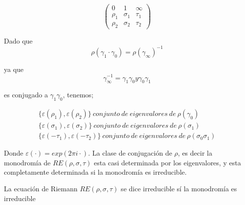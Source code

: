 \[ \left( \begin{array}{ccc}
0 & 1 & \infty \\
\rho_{1} & \sigma_{1} & \tau_{1} \\
\rho_{2} &\sigma_{2} & \tau_{2}  \end{array} \right)\]


Dado que 
\begin{equation}
\rho (\gamma_{1} \cdot \gamma_{0}) = \rho(\gamma_{\infty})^{-1}
\end{equation}

 ya que 
 \begin{equation}
 \gamma_{\infty}^{-1}=\gamma_{1} \gamma_{0}  y \gamma_{0}\gamma_{1}        
 \end{equation}
 
 
 es conjugado a $\gamma_{1} \gamma_{0}$, tenemos;

\begin{eqnarray} %
 \label{eqnarray:ecuacion1} \lbrace \varepsilon (\rho_{1}), \varepsilon (\rho_{2}) \rbrace \ conjunto \ de \ eigenvalores \ de \ \rho (\gamma_{0}) \\
 \lbrace \varepsilon (\sigma_{1}), \varepsilon (\sigma_{2}) \rbrace \  conjunto \ de \ eigenvalores \ de \ \rho (\sigma_{1}) \\
\lbrace \varepsilon(-\tau_{1}), \varepsilon (-\tau_{2}) \rbrace \  conjunto \ de \ eigenvalores \ de \ \rho (\sigma_{0} \sigma_{1})
\end{eqnarray}

Donde $\varepsilon (\cdot) = exp(2 \pi i \cdot)$. La clase de conjugaci\'on de $\rho$, es decir la monodrom\'ia de $RE(\rho,\sigma,\tau)$ esta casi determinada por los eigenvalores, y esta completamente determinada si la monodrom\'ia es irreducible.

\begin{defn}La ecuaci\'on de Riemann $RE(\rho,\sigma,\tau)$ se dice irreducible s\'i la monodrom\'ia es irreducible
\end{defn}

